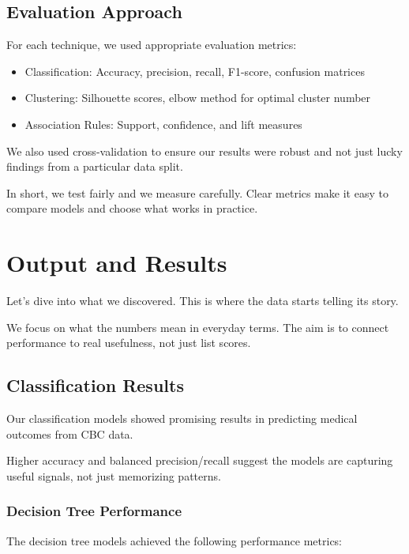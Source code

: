 \documentclass[12pt,a4paper]{article}
\begin{document}
\subsection{Evaluation Approach}

For each technique, we used appropriate evaluation metrics:
\begin{itemize}
    \item Classification: Accuracy, precision, recall, F1-score, confusion matrices
    \item Clustering: Silhouette scores, elbow method for optimal cluster number
    \item Association Rules: Support, confidence, and lift measures
\end{itemize}

We also used cross-validation to ensure our results were robust and not just lucky findings from a particular data split.

In short, we test fairly and we measure carefully. Clear metrics make it easy to compare models and choose what works in practice.

\section{Output and Results}

Let's dive into what we discovered. This is where the data starts telling its story.

We focus on what the numbers mean in everyday terms. The aim is to connect performance to real usefulness, not just list scores.

\subsection{Classification Results}

Our classification models showed promising results in predicting medical outcomes from CBC data.

Higher accuracy and balanced precision/recall suggest the models are capturing useful signals, not just memorizing patterns.

\subsubsection{Decision Tree Performance}

The decision tree models achieved the following performance metrics:
\end{document}
